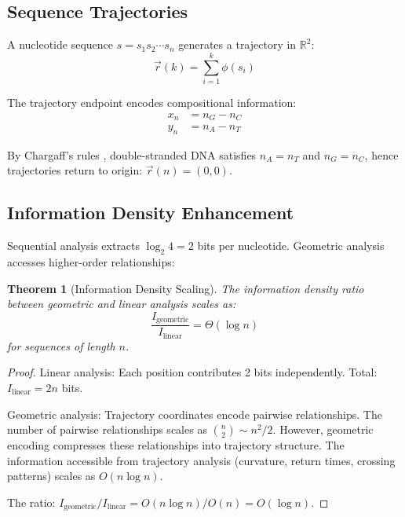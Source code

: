 \documentclass[twocolumn,10pt,a4paper]{article}
\newtheorem{theorem}{Theorem}[section]
\theoremstyle{definition}
\theoremstyle{remark}
\begin{document}
\subsection{Sequence Trajectories}

A nucleotide sequence $s = s_1 s_2 \cdots s_n$ generates a trajectory in $\mathbb{R}^2$:
\begin{equation}
    \vec{r}(k) = \sum_{i=1}^{k} \phi(s_i)
\end{equation}

The trajectory endpoint encodes compositional information:
\begin{align}
    x_n &= n_G - n_C \\
    y_n &= n_A - n_T
\end{align}

By Chargaff's rules \cite{chargaff1950}, double-stranded DNA satisfies $n_A = n_T$ and $n_G = n_C$, hence trajectories return to origin: $\vec{r}(n) = (0, 0)$.

\subsection{Information Density Enhancement}

Sequential analysis extracts $\log_2 4 = 2$ bits per nucleotide. Geometric analysis accesses higher-order relationships:

\begin{theorem}[Information Density Scaling]
\label{thm:info_density}
The information density ratio between geometric and linear analysis scales as:
\begin{equation}
    \frac{I_{\text{geometric}}}{I_{\text{linear}}} = \Theta(\log n)
\end{equation}
for sequences of length $n$.
\end{theorem}

\begin{proof}
Linear analysis: Each position contributes 2 bits independently. Total: $I_{\text{linear}} = 2n$ bits.

Geometric analysis: Trajectory coordinates encode pairwise relationships. The number of pairwise relationships scales as $\binom{n}{2} \sim n^2/2$. However, geometric encoding compresses these relationships into trajectory structure. The information accessible from trajectory analysis (curvature, return times, crossing patterns) scales as $O(n \log n)$.

The ratio: $I_{\text{geometric}}/I_{\text{linear}} = O(n \log n)/O(n) = O(\log n)$.
\end{proof}
\end{document}

